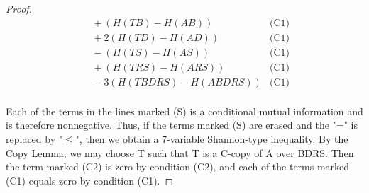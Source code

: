 \documentclass[10pt,journal]{IEEEtran}
\begin{document}
\begin{proof}
\begin{align*}
      &\ \   + (H(TB)-H(AB))                                                      & \text{(C1)} \\
      &\ \   + 2(H(TD)-H(AD))                                                    & \text{(C1)} \\
      &\ \   - (H(TS)-H(AS))                                                   & \text{(C1)} \\
      &\ \   + (H(TRS)-H(ARS))                                                    & \text{(C1)} \\
      &\ \   - 3(H(TBDRS)-H(ABDRS))                                                     & \text{(C1)} \\
\end{align*}

Each of the terms in the lines marked (S) is a conditional mutual
information and is therefore nonnegative.  Thus, if the terms marked (S)
are erased and the "=" is replaced by "$\leq$", then we obtain a 7-variable
Shannon-type inequality.  By the Copy Lemma, we may choose T such
that T is a C-copy of A over BDRS.  Then the term marked (C2) is zero
by condition (C2), and each of the terms marked (C1) equals zero
by condition (C1).


\end{proof}
\end{document}
